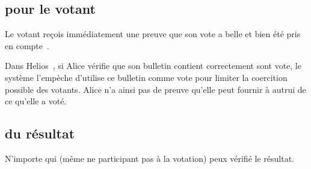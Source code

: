 \documentclass[../report]{subfiles}
\begin{document}
\subsection{pour le votant}
Le votant reçois immédiatement une preuve que son vote a belle et bien été pris en 
compte~\cite{adida_ballot_2006}.

Dans Helios~\cite{noauthor_helios_nodate}, si Alice vérifie que son bulletin contient
correctement sont vote, le système l'empèche d'utilise ce bulletin comme vote pour limiter
la coercition possible des votants.
Alice n'a ainsi pas de preuve qu'elle peut fournir à autrui de ce qu'elle a voté.

\subsection{du résultat}
N'importe qui (même ne participant pas à la votation) peux vérifié le résultat.
\end{document}
